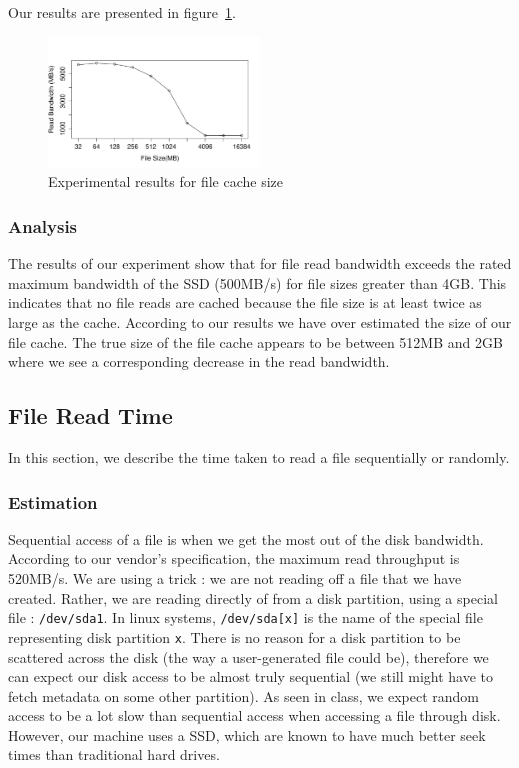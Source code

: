 Our results are presented in figure~\ref{figure:cacheresult}.

\begin{figure}
    \centering
    \includegraphics[width=0.5\textwidth]{cache-results.pdf}
    \caption{Experimental results for file cache size}
    \label{figure:cacheresult}
\end{figure}

\subsubsection{Analysis}

The results of our experiment show that for file read bandwidth exceeds the rated maximum bandwidth of the SSD (500MB/s) for file sizes greater than 4GB. This indicates that no file reads are cached because 
the file size is at least twice as large as the cache. According to our results we have over estimated the size of our file cache. The true size of the file cache appears to be between 512MB and 2GB where we 
see a corresponding decrease in the read bandwidth. 

\subsection{File Read Time}

In this section, we describe the time taken to read a file sequentially or randomly.

\subsubsection{Estimation}

Sequential access of a file is when we get the most out of the disk bandwidth. According to our vendor's specification, the maximum read throughput is 520MB/s. We are using a trick : we are not reading off a file that we have created. Rather, we are reading directly of from a disk partition, using a special file : \texttt{/dev/sda1}. In linux systems, \texttt{/dev/sda[x]} is the name of the special file representing disk partition \texttt{x}. There is no reason for a disk partition to be scattered across the disk (the way a user-generated file could be), therefore we can expect our disk access to be almost truly sequential (we still might have to fetch metadata on some other partition). As seen in class, we expect random access to be a lot slow than sequential access when accessing a file through disk. However, our machine uses a SSD, which are known to have much better seek times than traditional hard drives. 

